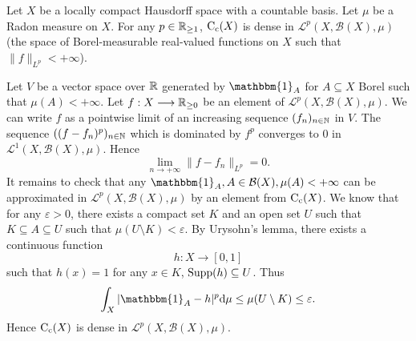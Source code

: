 \begin{lemmaenv}\label{lem:8.5.12}
    Let $X$ be a locally compact Hausdorff space with a countable basis.
    Let $\mu$ be a Radon measure on $X$.
    For any $p \in \mathbb{R}_{\ge 1}$, $\operatorname{C_{c}}(X)$ is dense in $\mathcal{L}^p(X,\mathcal{B}(X),\mu)$ (the space of Borel-measurable real-valued functions on $X$ such that $\|f\|_{L^p} < +\infty$).
\end{lemmaenv}
\begin{proofenv}
    Let $V$ be a vector space over $\mathbb{R}$ generated by $\mathbbm{1}_{A}$ for $A \subseteq X$ Borel such that $\mu(A) < +\infty$.
    Let $f : X \longrightarrow \mathbb{R}_{\ge 0}$ be an element of $\mathcal{L}^p(X,\mathcal{B}(X),\mu)$.
    We can write $f$ as a pointwise limit of an increasing sequence $(f_n)_{n \in \mathbb{N}}$ in $V$.
    The sequence $((f-f_n)^p)_{n \in \mathbb{N}}$ which is dominated by $f^p$ converges to $0$ in $\mathcal{L}^{1}(X,\mathcal{B}(X),\mu)$.
    Hence
    $$\lim_{n \rightarrow + \infty} \|f - f_n\|_{L^p} = 0.$$
    It remains to check that any $\mathbbm{1}_{A}, A \in \mathcal{B}(X),\mu(A) < +\infty$ can be approximated in $\mathcal{L}^{p}(X,\mathcal{B}(X),\mu)$ by an element from $\operatorname{C_{c}}(X)$.
    We know that for any $\varepsilon > 0$, there exists a compact set $K$ and an open set $U$ such that $K \subseteq A \subseteq U$ such that $\mu(U \setminus K) < \varepsilon$.
    By Urysohn's lemma, there exists a continuous function
    $$h : X \longrightarrow [0,1]$$
    such that $h(x) = 1$ for any $x \in K$, $\operatorname{\mathrm{Supp}}(h) \subseteq U$.
    Thus
    $$\int_{X}|\mathbbm{1}_{A} - h|^p \dd \mu \le \mu(U \setminus K) \le \varepsilon.$$
    Hence $\operatorname{C_{c}}(X)$ is dense in $\mathcal{L}^p(X,\mathcal{B}(X),\mu)$.
\end{proofenv}

